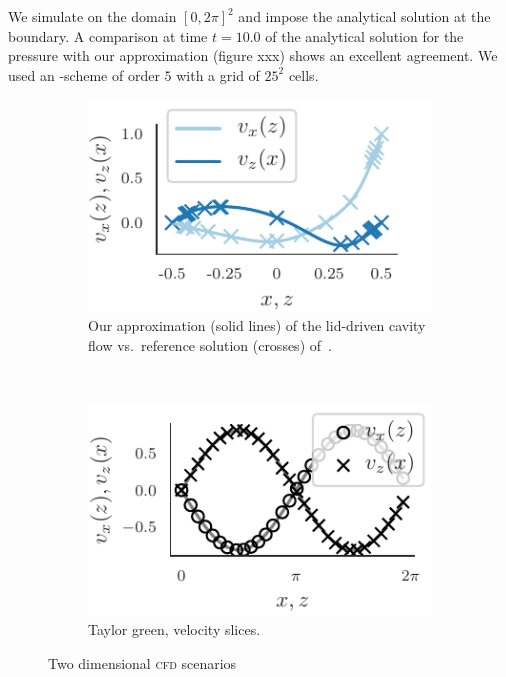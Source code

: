 \documentclass[runningheads]{llncs}
\begin{document}
We simulate on the domain $[0,2\pi]^2$ 
and impose the analytical solution at the boundary.
A comparison at time $t = 10.0$ of the analytical solution for the pressure with our approximation (figure xxx) shows an excellent agreement.
We used an \aderdg{}-scheme of order $5$ with a grid of $25^2$ cells.

\begin{figure}[tb]
  \centering
  \begin{subfigure}[t]{0.5\textwidth}
    \centering
    \includegraphics{paper_lid_driven_cavity}
    \caption{\label{fig:cavity-flow}Our approximation (solid lines) of the lid-driven cavity flow vs.\ reference solution (crosses) of~\cite{ghia1982high}.}
  \end{subfigure}~%
  \begin{subfigure}[t]{0.5\textwidth}
    \centering
    \includegraphics{paper_taylor_green_vel}
    \caption{\label{fig:taylor-green}Taylor green, velocity slices.}

  \end{subfigure}
  \caption{Two dimensional \textsc{cfd} scenarios}
  \label{fig:cdf-results}
\end{figure}
\end{document}
